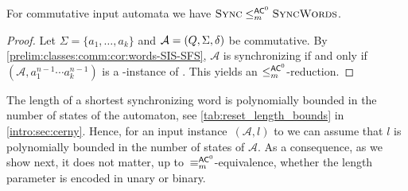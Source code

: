 \begin{proposition}  \label{compl:prop:reductions_comm}
	For commutative input automata
	we have $\text{\sc Sync} \le_m^{\textup{\textsf{AC}}^0} \text{\sc Sync\-Words}$.
\end{proposition}
\begin{proof}
	Let $\Sigma = \{a_1, \ldots, a_k\}$ and $\mathcal A = (Q, \Sigma, \delta)$ 
	be commutative.
	By \cref{prelim:classes:comm:cor:words-SIS-SFS},
	$\mathcal A$
	is synchronizing if and only if $(\mathcal A, a_1^{n-1} \cdots a_k^{n-1})$
	is a \rYES-instance of \DFASW. 
	This yields an $\le_m^{\textup{\textsf{AC}}^0}$-reduction.	
\end{proof}

The length of a shortest synchronizing word is polynomially bounded 
in the number of states of the automaton, see \cref{tab:reset_length_bounds} in \cref{intro:sec:cerny}.
Hence, for an input instance~$(\mathcal A, l)$ to \DFASWS 
we can assume that $l$ is polynomially bounded in the number of states of $\mathcal A$.
As a consequence, as we show next, it does not matter, 
up to~$\equiv_m^{\textup{\textsf{AC}}^0}$-equivalence, whether the length parameter is encoded
in unary or binary.



